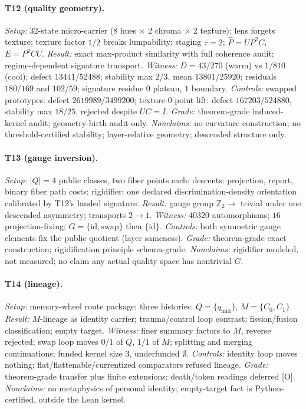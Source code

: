 \documentclass[11pt]{article}
\newcommand{\gradeO}{\textsf{[O]}}
\theoremstyle{definition}
\begin{document}
\paragraph{T12 (quality geometry).}
\emph{Setup:} 32-state micro-carrier (8 hues $\times$ 2 chroma $\times$ 2
texture); lens forgets texture; texture factor $1/2$ breaks lumpability;
staging $\tau = 2$; $\hat P = U P^2 C$, $E = P^2 C U$. \emph{Result:} exact
max-product similarity with full coherence audit; regime-dependent signature
transport. \emph{Witness:} $D = 43/270$ (warm) vs $1/810$ (cool); defect
$13441/52488$; stability max $2/3$, mean $13801/25920$; residuals $180/169$
and $102/59$; signature residue $0$ plateau, $1$ boundary. \emph{Controls:}
swapped prototypes: defect $2619989/3499200$; texture-0 point lift: defect
$167203/524880$, stability max $18/25$, rejected despite $UC = I$.
\emph{Grade:} theorem-grade induced-kernel audit; geometry-birth audit-only.
\emph{Nonclaims:} no curvature construction; no threshold-certified
stability; layer-relative geometry; descended structure only.

\paragraph{T13 (gauge inversion).}
\emph{Setup:} $|Q| = 4$ public classes, two fiber points each; descents:
projection, report, binary fiber path costs; rigidifier: one declared
discrimination-density orientation calibrated by T12's landed signature.
\emph{Result:} gauge group $\mathbb{Z}_2 \to$ trivial under one descended
asymmetry; transports $2 \to 1$. \emph{Witness:} $40320$ automorphisms; $16$
projection-fixing; $G = \{\mathrm{id}, \mathrm{swap}\}$ then
$\{\mathrm{id}\}$. \emph{Controls:} both symmetric gauge elements fix the
public quotient (layer sameness). \emph{Grade:} theorem-grade exact
construction; rigidification principle schema-grade. \emph{Nonclaims:}
rigidifier modeled, not measured; no claim any actual quality space has
nontrivial $G$.

\paragraph{T14 (lineage).}
\emph{Setup:} memory-wheel route package; three histories; $Q = \{q_\mathrm{mid}\}$,
$M = \{C_0, C_1\}$. \emph{Result:} $M$-lineage as identity carrier;
trauma/control loop contrast; fission/fusion classification; empty target.
\emph{Witness:} finer summary factors to $M$, reverse rejected; swap loop
moves $0/1$ of $Q$, $1/1$ of $M$; splitting and merging continuations;
funded kernel size $3$, underfunded $\emptyset$. \emph{Controls:} identity
loop moves nothing; flat/flattenable/currentized comparators refused
lineage. \emph{Grade:} theorem-grade transfer plus finite extensions;
death/token readings deferred \gradeO. \emph{Nonclaims:} no metaphysics of
personal identity; empty-target fact is Python-certified, outside the Lean
kernel.
\end{document}

